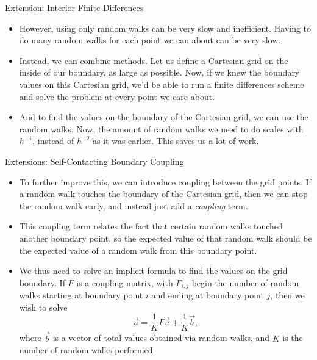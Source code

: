 \documentclass{beamer}
\newcommand\mat[1]{#1}
\begin{document}
\begin{frame}{Extension: Interior Finite Differences}
\begin{itemize}
\item However, using only random walks can be very slow and inefficient.
Having to do many random walks for each point we can about can be very slow.
\item Instead, we can combine methods.
Let us define a Cartesian grid on the inside of our boundary,
as large as possible.
Now, if we knew the boundary values on this Cartesian grid,
we'd be able to run a finite differences scheme
and solve the problem at every point we care about.
\item And to find the values on the boundary of the Cartesian grid,
we can use the random walks.
Now, the amount of random walks we need to do scales with $h^{-1}$,
instead of $h^{-2}$ as it was earlier.
This saves us a lot of work.
\end{itemize}
\end{frame}

\begin{frame}{Extensions: Self-Contacting Boundary Coupling}
\begin{itemize}
\item To further improve this,
we can introduce coupling between the grid points.
If a random walk touches the boundary of the Cartesian grid,
then we can stop the random walk early,
and instead just add a \emph{coupling} term.
\item This coupling term relates the fact that certain random walks
touched another boundary point, so the expected value of that random walk
should be the expected value of a random walk from this boundary point.
\item We thus need to solve an implicit formula
to find the values on the grid boundary.
If $\mat{F}$ is a coupling matrix,
with $F_{i,j}$ begin the number of random walks
starting at boundary point $i$ and ending at boundary point $j$,
then we wish to solve
$$\vec{u}=\frac{1}{K}\mat{F}\vec{u}+\frac{1}{K}\vec{b},$$
where $\vec{b}$ is a vector of total values obtained via random walks,
and $K$ is the number of random walks performed.
\end{itemize}
\end{frame}
\end{document}
